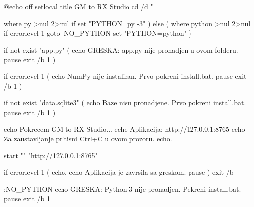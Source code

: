 @echo off
setlocal
title GM to RX Studio
cd /d "%

where py >nul 2>nul
if %
    set "PYTHON=py -3"
) else (
    where python >nul 2>nul
    if errorlevel 1 goto :NO_PYTHON
    set "PYTHON=python"
)

if not exist "app.py" (
    echo GRESKA: app.py nije pronadjen u ovom folderu.
    pause
    exit /b 1
)

if errorlevel 1 (
    echo NumPy nije instaliran. Prvo pokreni install.bat.
    pause
    exit /b 1
)

if not exist "data\factory.sqlite3" (
    echo Baze nisu pronadjene. Prvo pokreni install.bat.
    pause
    exit /b 1
)

echo Pokrecem GM to RX Studio...
echo Aplikacija: http://127.0.0.1:8765
echo Za zaustavljanje pritisni Ctrl+C u ovom prozoru.
echo.

start "" "http://127.0.0.1:8765"

if errorlevel 1 (
    echo.
    echo Aplikacija je zavrsila sa greskom.
    pause
)
exit /b %

:NO_PYTHON
echo GRESKA: Python 3 nije pronadjen. Pokreni install.bat.
pause
exit /b 1
